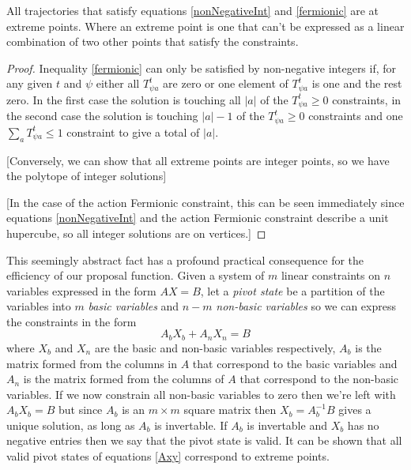 \begin{theorem}
All trajectories that satisfy equations \ref{nonNegativeInt} and \ref{fermionic} are at extreme points. Where an extreme point is one that can't be expressed as a linear combination of two other points that satisfy the constraints.
\end{theorem}
\begin{proof}

Inequality \ref{fermionic} can only be satisfied by non-negative integers if, for any given $t$ and $\psi$ either all $T^t_{\psi a}$ are zero or one element of $T^t_{\psi a}$ is one and the rest zero. In the first case the solution is touching all $|a|$ of the $T^t_{\psi a} \ge 0$ constraints, in the second case the solution is touching $|a|-1$ of the $T^t_{\psi a} \ge 0$ constraints and one $\sum_a T^t_{\psi a} \le 1$ constraint to give a total of $|a|$.

[Conversely, we can show that all extreme points are integer points, so we have the polytope of integer solutions]

[In the case of the action Fermionic constraint, this can be seen immediately since equations \ref{nonNegativeInt} and the action Fermionic constraint describe a unit hupercube, so all integer solutions are on vertices.]

\end{proof}


This seemingly abstract fact has a profound practical consequence for the efficiency of our proposal function.
Given a system of $m$ linear constraints on $n$ variables expressed in the form $AX=B$, let a \textit{pivot state} be a partition of the variables into $m$ \textit{basic variables} and $n-m$ \textit{non-basic variables} so we can express the constraints in the form
\begin{equation}
A_bX_b + A_nX_n = B
\label{tableau1}
\end{equation}
where $X_b$ and $X_n$ are the basic and non-basic variables respectively, $A_b$ is the matrix formed from the columns in $A$ that correspond to the basic variables and $A_n$ is the matrix formed from the columns of $A$ that correspond to the non-basic variables. If we now constrain all non-basic variables to zero then we're left with $A_bX_b = B$ but since $A_b$ is an $m \times m$ square matrix then $X_b = A_b^{-1}B$ gives a unique solution, as long as $A_b$ is invertable. If $A_b$ is invertable and $X_b$ has no negative entries then we say that the pivot state is valid. It can be shown that all valid pivot states of equations \ref{Axy} correspond to extreme points\cite{dantzig1955generalized}.


